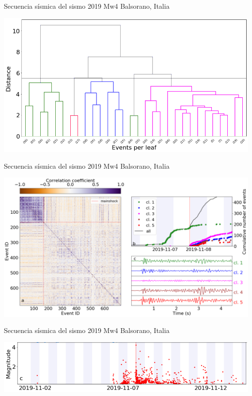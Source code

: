 \documentclass{beamer}
\begin{document}
\begin{frame}
 {Secuencia s\'ismica del sismo 2019 Mw4 Balsorano, Italia}

 \begin{minipage}{1\linewidth}
  \centering \includegraphics[width=1\linewidth]{images/dendrogram_balsorano.png}
 \end{minipage} 
 
\end{frame}


\begin{frame}
 {Secuencia s\'ismica del sismo 2019 Mw4 Balsorano, Italia}

 \begin{minipage}{1\linewidth}
  \centering \includegraphics[width=1\linewidth]{images/wigg_cc_mat_cluster.png}
 \end{minipage} 
 
\end{frame}

\begin{frame}
 {Secuencia s\'ismica del sismo 2019 Mw4 Balsorano, Italia}

   \includegraphics[width=1\linewidth]{images/magnitudes.png}
 
\end{frame}
\end{document}
